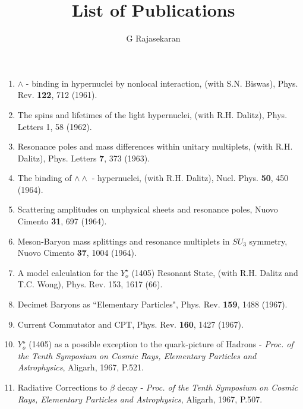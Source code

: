 \title{List of Publications} %
\author{G Rajasekaran} %
\maketitle 
\sf


\begin{enumerate}
\item $\wedge$ - binding in hypernuclei by nonlocal interaction, (with
S.N. Biswas),  Phys. Rev. {\bf 122}, 712 (1961). 

\item The spins and lifetimes of the light hypernuclei, (with R.H.
Dalitz), Phys. Letters {1}, 58 (1962).

\item Resonance poles and mass differences within unitary multiplets,
(with R.H. Dalitz), Phys. Letters {\bf 7}, 373 (1963).

\item The binding of $\wedge \wedge$ - hypernuclei, (with R.H. Dalitz),
Nucl. Phys. {\bf 50}, 450 (1964).

\item Scattering amplitudes on unphysical sheets and resonance poles,
Nuovo Cimento {\bf 31}, 697 (1964).

\item Meson-Baryon mass splittings and resonance multiplets in $SU_3$
symmetry, Nuovo Cimento {\bf 37}, 1004 (1964).

\item A model calculation for the $Y^\star_o$ (1405) Resonant State,
(with R.H. Dalitz and T.C. Wong), Phys. Rev. 153, 1617 (66).

\item Decimet Baryons as ``Elementary Particles", Phys. Rev. {\bf
159}, 1488 (1967).

\item Current Commutator and CPT, Phys. Rev. {\bf 160}, 1427 (1967).

\item $Y^\star_o$ (1405) as a possible exception to the quark-picture of
Hadrons - {\it Proc. of the Tenth Symposium on Cosmic Rays, Elementary
Particles and Astrophysics}, Aligarh, 1967, P.521.

\item Radiative Corrections to $\beta$ decay - {\it Proc. of the Tenth
Symposium on Cosmic Rays, Elementary Particles and Astrophysics},
Aligarh, 1967, P.507.


\end{enumerate}
